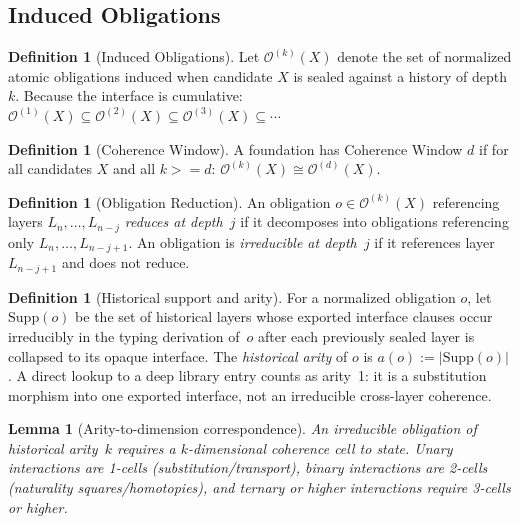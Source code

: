 \documentclass[11pt,a4paper]{article}
\def\geq{>=}%
\theoremstyle{plain}
\newtheorem{lemma}[theorem]{Lemma}
\theoremstyle{definition}
\newtheorem{definition}[theorem]{Definition}
\theoremstyle{remark}
\begin{document}
\subsection{Induced Obligations}

\begin{definition}[Induced Obligations]
\label{def:obligations}
Let $\mathcal{O}^{(k)}(X)$ denote the set of normalized atomic obligations induced when candidate $X$ is sealed against a history of depth $k$.
Because the interface is cumulative:
$\mathcal{O}^{(1)}(X) \subseteq \mathcal{O}^{(2)}(X) \subseteq \mathcal{O}^{(3)}(X) \subseteq \cdots$
\end{definition}

\begin{definition}[Coherence Window]
\label{def:window}
A foundation has Coherence Window $d$ if for all candidates $X$ and all $k \geq d$:
$\mathcal{O}^{(k)}(X) \cong \mathcal{O}^{(d)}(X)$.
\end{definition}

\begin{definition}[Obligation Reduction]
\label{def:reduction}
An obligation $o \in \mathcal{O}^{(k)}(X)$ referencing layers $L_n, \ldots, L_{n-j}$ \emph{reduces at depth~$j$} if it decomposes into obligations referencing only $L_n, \ldots, L_{n-j+1}$.
An obligation is \emph{irreducible at depth~$j$} if it references layer $L_{n-j+1}$ and does not reduce.
\end{definition}

\begin{definition}[Historical support and arity]
\label{def:arity}
For a normalized obligation $o$, let $\mathrm{Supp}(o)$ be the set of historical layers whose exported interface clauses occur irreducibly in the typing derivation of~$o$ after each previously sealed layer is collapsed to its opaque interface.
The \emph{historical arity} of $o$ is $a(o) := |\mathrm{Supp}(o)|$.
A direct lookup to a deep library entry counts as arity~1: it is a substitution morphism into one exported interface, not an irreducible cross-layer coherence.
\end{definition}

\begin{lemma}[Arity-to-dimension correspondence]
\label{lem:arity-dimension}
An irreducible obligation of historical arity~$k$ requires a $k$-dimensional coherence cell to state.
Unary interactions are 1-cells (substitution/transport), binary interactions are 2-cells (naturality squares/homotopies), and ternary or higher interactions require 3-cells or higher.
\end{lemma}
\end{document}

